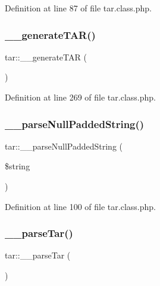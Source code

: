 Definition at line 87 of file tar.\+class.\+php.

\mbox{\label{classtar_a97fd04b02c85bbb3eb588a160237f375}} 
\subsubsection{\texorpdfstring{\+\_\+\+\_\+generate\+T\+A\+R()}{\_\_generateTAR()}}
{\footnotesize\ttfamily tar\+::\+\_\+\+\_\+generate\+T\+AR (\begin{DoxyParamCaption}{ }\end{DoxyParamCaption})}



Definition at line 269 of file tar.\+class.\+php.

\mbox{\label{classtar_ab9d60205cd0862d6d3cfb582b43a3288}} 
\subsubsection{\texorpdfstring{\+\_\+\+\_\+parse\+Null\+Padded\+String()}{\_\_parseNullPaddedString()}}
{\footnotesize\ttfamily tar\+::\+\_\+\+\_\+parse\+Null\+Padded\+String (\begin{DoxyParamCaption}\item[{}]{\$string }\end{DoxyParamCaption})}



Definition at line 100 of file tar.\+class.\+php.

\mbox{\label{classtar_a8d8793668fa7e2de0beb4dca399ee3ed}} 
\subsubsection{\texorpdfstring{\+\_\+\+\_\+parse\+Tar()}{\_\_parseTar()}}
{\footnotesize\ttfamily tar\+::\+\_\+\+\_\+parse\+Tar (\begin{DoxyParamCaption}{ }\end{DoxyParamCaption})}



